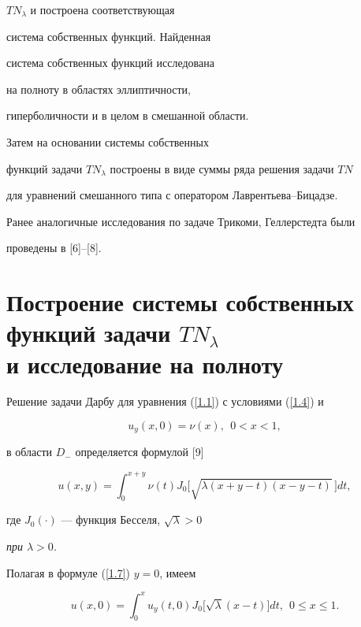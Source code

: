 $TN_\lambda$ и построена соответствующая 


система собственных функций. Найденная 


система собственных функций исследована 


на полноту в областях эллиптичности, 


гиперболичности и в целом в смешанной области. 


Затем на основании системы собственных 


функций задачи $TN_\lambda$ построены в виде суммы ряда решения задачи $TN$ 


для уравнений смешанного типа с оператором Лаврентьева--Бицадзе. 


Ранее аналогичные исследования по задаче Трикоми, Геллерстедта были 


проведены в [6]--[8].





\section{Построение системы собственных функций задачи $TN_\lambda$\protect\\


и исследование на полноту}





Решение задачи Дарбу для уравнения (\ref{1.1}) с условиями  (\ref{1.4}) и 


$$


u_y(x,0)=\nu(x),\ \ 0<x<1,


$$


в области $D_-$ определяется формулой [9]


\begin{equation}


u(x,y)=\int_0^{x+y}\nu(t) J_0\big[


\sqrt{\lambda(x+y-t)(x-y-t)}\,\big]dt,\label{1.7}


\end{equation}


где $J_0(\cdot)$ --- функция Бесселя, $\sqrt \lambda>0$


{\it при $\lambda >0$.}





Полагая в формуле (\ref{1.7}) $y=0$, имеем


\begin{equation}


u(x,0)=\int_0^{x}u_{y}(t,0) J_0\big[


\sqrt{\lambda}(x-t)\big]dt,\ \ 0\leq x\leq 1.\label{1.8}


\end{equation}





